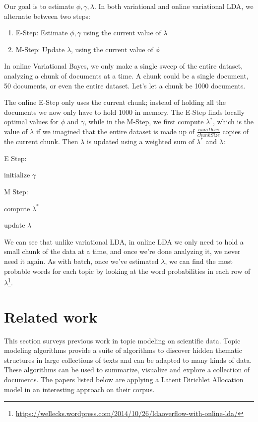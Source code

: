 \documentclass[12pt]{report}
\begin{document}
Our goal is to estimate $\phi, \gamma, \lambda$. In both variational 
and online variational LDA, we alternate between two steps:

\begin{enumerate}
\item E-Step: Estimate $\phi, \gamma$ using the current value of $\lambda$
\item M-Step: Update $\lambda$, using the current value of $\phi$
\end{enumerate}

In online Variational Bayes, we only make a single sweep of the entire dataset, 
analyzing a chunk of documents at a time. A chunk could be a single document, 
50 documents, or even the entire dataset. Let's let a chunk be 1000 documents.

The online E-Step only uses the current chunk; instead of holding all the 
documents we now only have to hold 1000 in memory. The E-Step finds locally 
optimal values for $\phi$ and $\gamma$, while in the M-Step, we first compute 
$\lambda^{*}$, which is the value of $\lambda$ if we imagined that the entire 
dataset is made up of $\frac{numDocs}{chunkSize}$ copies of the current chunk. 
Then $\lambda$ is updated using a weighted sum of $\lambda^{*}$ and
$\lambda$:
\begin{algorithm}
\SetAlgoNoLine
E Step:

initialize $\gamma$

M Step:

compute $\lambda^{*}$

update $\lambda$
\end{algorithm}

We can see that unlike variational LDA, in online LDA we only need to
hold a small chunk of the data at a time, and once we're done
analyzing it, we never need it again. As with batch, once we've
estimated $\lambda$, we can find the most probable words for each
topic by looking at the word probabilities in each row of
$\lambda$\footnote{\url{https://wellecks.wordpress.com/2014/10/26/ldaoverflow-with-online-lda/}}.

\section{Related work}
\label{relatedwork}
This section surveys previous work in topic modeling on
scientific data. Topic modeling algorithms provide a
suite of algorithms to discover hidden thematic structures 
in large collections of texts and can be adapted to
many kinds of data. These algorithms can be used to summarize,
visualize and explore a collection of documents. The papers listed
below are applying a Latent Dirichlet Allocation model in an
interesting approach on their corpus.
\end{document}
